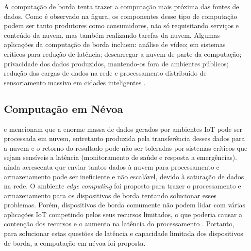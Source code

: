 A computação de borda tenta trazer a computação mais próxima das fontes de
dados.
Como é observado na figura, os
componentes desse tipo de computação podem ser tanto produtores como
consumidores, não só requisitando serviços e conteúdo da nuvem, mas também
realizando tarefas da nuvem.
Algumas aplicações da computação de borda incluem: análise de vídeo;
em sistemas críticos para redução de latência;
descarregar a nuvem de parte da computação;
privacidade dos dados produzidos, mantendo-os fora de ambientes públicos;
redução das cargas de dados na rede e
processamento distribuído de sensoriamento massivo em cidades inteligentes \cite{Shi2016}.


\subsection{Computação em Névoa}

 e 
mencionam que a enorme massa de dados gerados por ambientes IoT pode ser
processada em nuvem, entretanto  produzida pela transferência desses
dados para a nuvem e o retorno do resultado pode não ser toleradas por sistemas
críticos que sejam sensíveis a latência (monitoramento de saúde e resposta a
emergências).
 ainda acrescenta que enviar tantos
dados à nuvem
para processamento e armazenamento pode ser ineficiente e não escalável, devido à
saturação de dados na rede.
O ambiente \emph{edge computing} foi proposto para trazer o
processamento e armazenamento para os dispositivos de borda tentando solucionar
esses problemas.
Porém, dispositivos de borda comumente não podem lidar com várias
aplicações IoT competindo pelos seus recursos limitados, o que poderia causar a
contenção dos recursos e o aumento na latência do processamento
\cite{Dastjerdi2016}. Portanto, para solucionar estas questões de latência e
capacidade limitada dos dispositivos de borda, a computação em névoa foi proposta.

